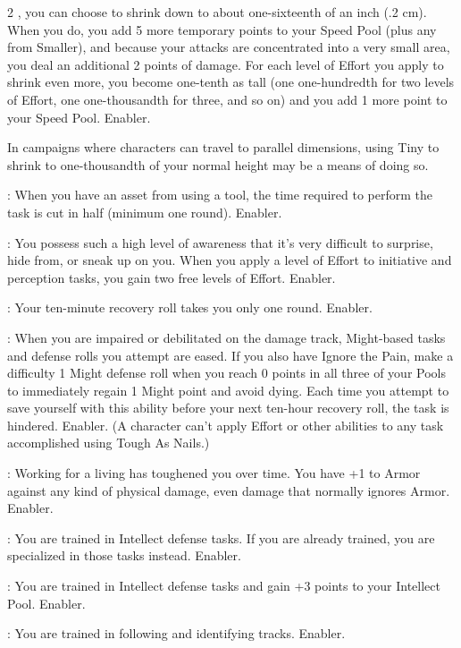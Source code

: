 \begin{multicols}{2}
, you can choose to shrink down to about one-sixteenth of an inch (.2 cm). When you do, you add 5 more temporary points to your Speed Pool (plus any from Smaller), and because your attacks are concentrated into a very small area, you deal an additional 2 points of damage. For each level of Effort you apply to shrink even more, you become one-tenth as tall (one one-hundredth for two levels of Effort, one one-thousandth for three, and so on) and you add 1 more point to your Speed Pool. Enabler.

In campaigns where characters can travel to parallel dimensions, using Tiny to shrink to one-thousandth of your normal height may be a means of doing so.

: When you have an asset from using a tool, the time required to perform the task is cut in half (minimum one round). Enabler. 
 
: You possess such a high level of awareness that it’s very difficult to surprise, hide from, or sneak up on you. When you apply a level of Effort to initiative and perception tasks, you gain two free levels of Effort. Enabler.
 
: Your ten-minute recovery roll takes you only one round. Enabler. 
 
: When you are impaired or debilitated on the damage track, Might-based tasks and defense rolls you attempt are eased. If you also have Ignore the Pain, make a difficulty 1 Might defense roll when you reach 0 points in all three of your Pools to immediately regain 1 Might point and avoid dying. Each time you attempt to save yourself with this ability before your next ten-hour recovery roll, the task is hindered. Enabler. (A character can’t apply Effort or other abilities to any task accomplished using Tough As Nails.)
 
: Working for a living has toughened you over time. You have +1 to Armor against any kind of physical damage, even damage that normally ignores Armor. Enabler. 
 
: You are trained in Intellect defense tasks. If you are already trained, you are specialized in those tasks instead. Enabler. 
 
: You are trained in Intellect defense tasks and gain +3 points to your Intellect Pool. Enabler. 
 
: You are trained in following and identifying tracks. Enabler. 
 

\end{multicols}
